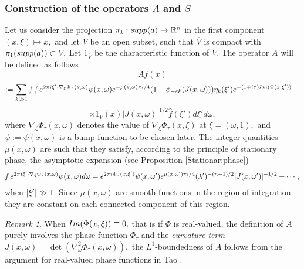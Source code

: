 \documentclass[12pt, reqno]{amsart}
\theoremstyle{definition}
\theoremstyle{remark}
\newtheorem{remark}[theorem]{Remark}
\numberwithin{equation}{section}
\begin{document}
\subsubsection{Construction of the operators $A$ and  $S$}\label{Construction of the operatorsA:S} Let us consider the projection $\pi_{1}:\textnormal{supp}(a)\rightarrow \mathbb{R}^n$ in the first component $(x,\xi)\mapsto x,$ and let $V$ be an open subset, such that $\overline{V}$ is compact with $\pi_{1}(\textnormal{supp}(a))\subset V.$ Let $1_{\overline{V}}$ be the characteristic function of $\overline{V}.$
The operator $A$ will be defined as follows
$$  Af(x)$$
\begin{align*}
  := \sum_{k\gg 1}\smallint\smallint e^{2\pi i\xi'\cdot \nabla_\xi\Phi_\tau(x,\omega)}\psi(x,\omega)e^{-\mu(x,\omega)\pi i/4} &(1-\phi_{-\varepsilon k}(J(x,\omega)))\eta_{k}(\xi')e^{-(1+i\tau)\textnormal{Im}(\Phi(x,\xi'))}
\end{align*}
$$ \times 1_{\overline{V}}(x) |J(x,\omega)|^{1/2}\widehat{f}(\xi')d\xi'd\omega,$$
where $\nabla_\xi\Phi_\tau(x,\omega)$ denotes the value of $\nabla_\xi\Phi_\tau(x,\xi)$ at $\xi=(\omega,1),$ and
 $\psi:=\psi(x,\omega)$ is a bump function to be chosen later. The integer quantities $\mu(x,\omega)$ are such that they satisfy, according to the principle of stationary phase, the asymptotic expansion (see Proposition \ref{Stationar:phase})
    \begin{align*}
        \smallint e^{2\pi i\xi'\cdot \nabla_\xi\Phi_\tau(x,\omega)}\psi(x,\omega)d\omega=e^{2\pi i\Phi_\tau(x,\xi')}\psi(x,\omega')e^{\mu(x,\omega')\pi i/4}(\lambda')^{-(n-1)/2}|J(x,\omega')|^{-1/2}+\cdots,
    \end{align*} when $|\xi'|\gg 1.$ Since $\mu(x,\omega)$ are smooth functions in the region of integration they are constant on each connected component of this region.    

\begin{remark}
 When  $\textnormal{Im}(\Phi(x,\xi))\equiv 0,$ that is if $\Phi$ is real-valued, the definition of $A$ purely involves the phase function $\Phi_\tau$ and the {\it curvature term } $J(x,\omega)=\det(\nabla_\omega^2\Phi_\tau(x,\omega)),$ the $L^1$-boundedness of $A$ follows from the argument for real-valued phase functions in Tao \cite[Pages 14-15]{Tao}. 
\end{remark}
\end{document}
